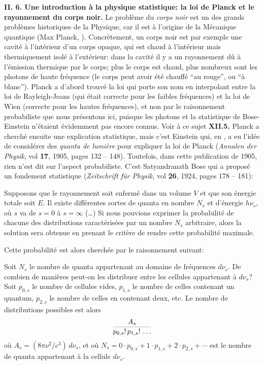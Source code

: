 {\bf II. 6.  Une introduction \`a la physique statistique: la loi de Planck  
et le rayonnement du corps noir.}
\medskip
Le probl\`eme du {\it corps noir} est un des grands probl\`emes  
historiques de la Physique, car il est \`a l'origine de la M\'ecanique 
quantique (Max Planck, {}). Concr\`etement, un corps noir  
est par exemple une cavit\'e \`a l'int\'erieur d'un corps opaque, qui est 
chaud \`a l'int\'erieur mais thermiquement isol\'e \`a l'ext\'erieur: dans  
la cavit\'e il y a un rayonnement d\^u \`a l'\'emission thermique par le 
corps; plus le corps est chaud, plus nombreux sont les photons de haute 
fr\'equence (le corps peut avoir \'et\'e chauff\'e ``au rouge'', ou ``\`a 
blanc''). Planck a d'abord trouv\'e la loi qui porte son nom en interpolant 
entre la loi de Rayleigh-Jeans (qui \'etait correcte pour les faibles 
fr\'equences) et la loi de Wien (correcte pour les hautes fr\'equences), 
et non par le raisonnement probabiliste que nous pr\'esentons ici, 
puisque les photons et la statistique de Bose-Einstein n'\'etaient 
\'evidemment pas encore connus. Voir \`a ce sujet {\bf XII.5.}  
Planck  a cherch\'e ensuite une explication statistique, 
mais c'est Einstein qui, en {}, a eu l'id\'ee de 
consid\'erer des {\it quanta de lumi\`ere} pour expliquer la  
loi de Planck ({\sl Annalen der Physik}, vol {\bf 17}, 
1905, pages 132 -- 148). Toutefois, dans cette publication de 1905,  
rien n'est dit sur l'aspect probabiliste. C'est Satyandranath Bose qui a 
propos\'e un fondement statistique ({\sl Zeitschrift f\"ur Physik}, 
vol {\bf 26}, 1924, pages 178 -- 181): 
\smallskip 
{\cit Supposons que le rayonnement soit enferm\'e dans un 
volume $V$ et que son \'energie totale soit $E$. Il existe diff\'erentes 
sortes de quanta en nombre $N_s$ et d'\'energie $h \nu_s$, o\`u $s$ 
va de $s=0$ \`a $s=\infty$ (\dots ) Si nous pouvions exprimer la  
probabilit\'e de chacune des distributions caract\'eris\'ees par un  
nombre $N_s$ arbitraire, alors la solution sera obtenue en prenant le 
crit\`ere de rendre cette probabilit\'e maximale. \par } 
\medskip 
Cette probabilit\'e est alors cherch\'ee par le raisonnement suivant: 
\smallskip 
{\cit Soit $N_s$ le nombre de quanta appartenant au domaine de 
fr\'equences $d\nu_s$. De combien de mani\`eres peut-on les distribuer 
entre les cellules appartenant \`a $d\nu_s$? Soit $p_{0,s}$ le nombre 
de cellules vides, $p_{1,s}$ le nombre de celles contenant un quantum, 
$p_{2,s}$ le nombre de celles en contenant deux, etc. Le nombre de 
distributions possibles est alors 
$${A_s \over p_{0,s}!\, p_{1,s}!\, \ldots }$$ 
o\`u $A_s = (8\pi\nu^2/c^3)\, d\nu_s$, et o\`u $N_s = 0 \cdot p_{0,s} +  
1 \cdot p_{1,s} + 2 \cdot p_{2,s} + \cdots$ est le nombre de quanta  
appartenant \`a la cellule $d\nu_s$. \par } 
